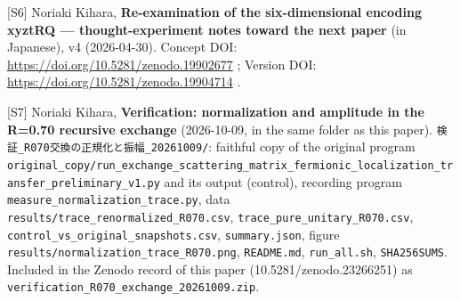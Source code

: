 \documentclass[
  a4paper,
]{article}
\begin{document}
{[}S6{]} Noriaki Kihara, \textbf{Re-examination of the six-dimensional
encoding xyztRQ --- thought-experiment notes toward the next paper} (in
Japanese), v4 (2026-04-30). Concept DOI:
\url{https://doi.org/10.5281/zenodo.19902677} ; Version DOI:
\url{https://doi.org/10.5281/zenodo.19904714} .

{[}S7{]} Noriaki Kihara, \textbf{Verification: normalization and
amplitude in the R=0.70 recursive exchange} (2026-10-09, in the same
folder as this paper). \texttt{検証\_\allowbreak{}R070交換の正規化と振幅\_\allowbreak{}20261009/\allowbreak{}}:
faithful copy of the original program
\texttt{original\_\allowbreak{}copy/\allowbreak{}run\_\allowbreak{}exchange\_\allowbreak{}scattering\_\allowbreak{}matrix\_\allowbreak{}fermionic\_\allowbreak{}localization\_\allowbreak{}transfer\_\allowbreak{}preliminary\_\allowbreak{}v1.py}
and its output (control), recording program
\texttt{measure\_\allowbreak{}normalization\_\allowbreak{}trace.py}, data
\texttt{results/\allowbreak{}trace\_\allowbreak{}renormalized\_\allowbreak{}R070.csv},
\texttt{trace\_\allowbreak{}pure\_\allowbreak{}unitary\_\allowbreak{}R070.csv},
\texttt{control\_\allowbreak{}vs\_\allowbreak{}original\_\allowbreak{}snapshots.csv}, \texttt{summary.json},
figure \texttt{results/\allowbreak{}normalization\_\allowbreak{}trace\_\allowbreak{}R070.png},
\texttt{README.md}, \texttt{run\_\allowbreak{}all.sh}, \texttt{SHA256SUMS}. Included
in the Zenodo record of this paper (10.5281/zenodo.23266251) as
\texttt{verification\_\allowbreak{}R070\_\allowbreak{}exchange\_\allowbreak{}20261009.zip}.
\end{document}

